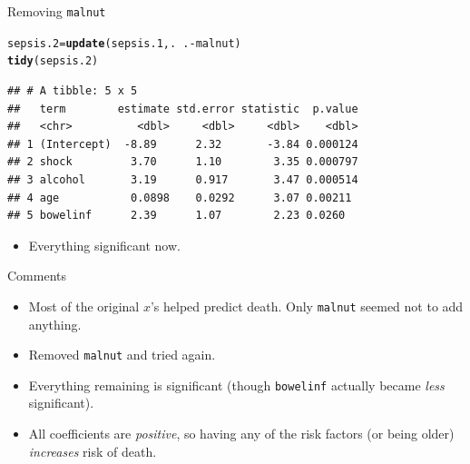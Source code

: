 \documentclass[unknownkeysallowed]{beamer}\usepackage[]{graphicx}\usepackage[]{color}
\makeatletter
\newcommand{\hlopt}[1]{\textcolor[rgb]{0,0,0}{#1}}%
\newcommand{\hlstd}[1]{\textcolor[rgb]{0.345,0.345,0.345}{#1}}%
\newcommand{\hlkwb}[1]{\textcolor[rgb]{0.69,0.353,0.396}{#1}}%
\newcommand{\hlkwd}[1]{\textcolor[rgb]{0.737,0.353,0.396}{\textbf{#1}}}%
\newenvironment{kframe}{%
 \def\at@end@of@kframe{}%
 \ifinner\ifhmode%
  \def\at@end@of@kframe{\end{minipage}}%
  \begin{minipage}{\columnwidth}%
 \fi\fi%
 \def\FrameCommand##1{\hskip\@totalleftmargin \hskip-\fboxsep
 \colorbox{shadecolor}{##1}\hskip-\fboxsep
     \hskip-\linewidth \hskip-\@totalleftmargin \hskip\columnwidth}%
 \MakeFramed {\advance\hsize-\width
   \@totalleftmargin\z@ \linewidth\hsize
   \@setminipage}}%
 {\par\unskip\endMakeFramed%
 \at@end@of@kframe}
\newenvironment{knitrout}{}{} %
\makeatother
\begin{document}
\begin{frame}[fragile]{Removing \texttt{malnut}}

 
\begin{knitrout}\footnotesize
{}\color{fgcolor}\begin{kframe}
\begin{alltt}
\hlstd{sepsis.2}\hlkwb{=}\hlkwd{update}\hlstd{(sepsis.1,.}\hlopt{~}\hlstd{.}\hlopt{-}\hlstd{malnut)}
\hlkwd{tidy}\hlstd{(sepsis.2)}
\end{alltt}
\begin{verbatim}
## # A tibble: 5 x 5
##   term        estimate std.error statistic  p.value
##   <chr>          <dbl>     <dbl>     <dbl>    <dbl>
## 1 (Intercept)  -8.89      2.32       -3.84 0.000124
## 2 shock         3.70      1.10        3.35 0.000797
## 3 alcohol       3.19      0.917       3.47 0.000514
## 4 age           0.0898    0.0292      3.07 0.00211 
## 5 bowelinf      2.39      1.07        2.23 0.0260
\end{verbatim}
\end{kframe}
\end{knitrout}

\begin{itemize}
\item Everything significant now.
\end{itemize}
  
 
  
\end{frame}

\begin{frame}[fragile]{Comments}

  \begin{itemize}
\item Most of the original $x$'s helped predict death. Only \texttt{malnut} seemed not to add anything.
\item Removed \texttt{malnut} and tried again.
\item Everything remaining is significant (though \texttt{bowelinf}
  actually became \emph{less} significant).
\item All coefficients are \emph{positive}, so having any of the risk
  factors (or being older)
  \emph{increases} risk of death.  
\end{itemize}

\end{frame}
\end{document}
